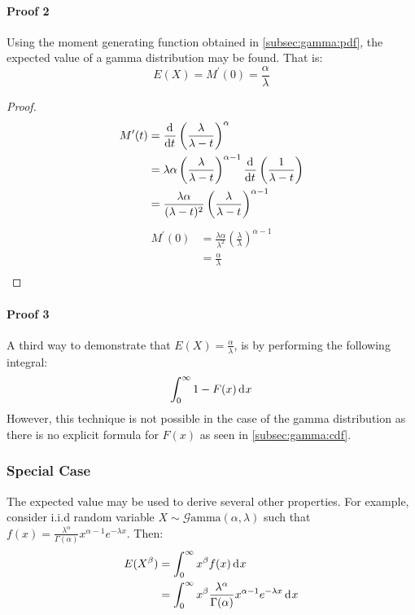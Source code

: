 \documentclass[12pt]{article}
\newcommand{\G}{\mathcal{G}}
\begin{document}
\paragraph{Proof 2}
Using the moment generating function obtained in \autoref{subsec:gamma:pdf}, the expected value of a gamma distribution
may be found. That is:
\begin{equation}
	E(X) = M^\prime(0) = \frac{\alpha}{\lambda}
\end{equation}
\begin{proof}
	\begin{equation}\label{eq:gamma:mgfprime}
		\begin{split}
			M^\prime(t)	&=	\mathop{}\!\frac{\mathrm{d}^{}}{\mathrm{d}t^{}}\left(\frac{\lambda}{\lambda - t}\right)^\alpha\\
						&=	\lambda\alpha\left(\frac{\lambda}{\lambda - t}\right)^{\alpha-1}\mathop{}\!\frac{\mathrm{d}^{}}{\mathrm{d}t^{}}\left(\frac{1}{\lambda - t}\right)\\
						&=	\frac{\lambda\alpha}{(\lambda - t)^2}\left(\frac{\lambda}{\lambda - t}\right)^{\alpha-1}
		\end{split}
	\end{equation}
	\begin{equation}
		\begin{split}
			M^\prime(0)	&=	\frac{\lambda\alpha}{\lambda^2}\left(\frac{\lambda}{\lambda}\right)^{\alpha-1}\\
						&=	\frac{\alpha}{\lambda}\\
		\end{split}
	\end{equation}
\end{proof}

\paragraph{Proof 3}
A third way to demonstrate that $E(X) = \frac{\alpha}{\lambda}$, is by performing the following integral:
\begin{equation}
	\int^\infty_0 1-F(x)\mathop{}\!\mathrm{d^{}}x
\end{equation}
However, this technique is not possible in the case of the gamma distribution as there is no explicit formula for $F(x)$
as seen in \autoref{subsec:gamma:cdf}.

\subsubsection{Special Case}
The expected value may be used to derive several other properties. For example, consider i.i.d random variable
$X\sim\G\text{amma}(\alpha, \lambda)$ such that $f(x) = \frac{\lambda^\alpha}{\Gamma(\alpha)}x^{\alpha-1}e^{-\lambda x}$.
Then:
\begin{equation}
	\begin{split}
		E(X^\beta)	&=	\int^\infty_0 x^\beta f(x)\mathop{}\!\mathrm{d^{}}x\\
					&=	\int^\infty_0 x^\beta \frac{\lambda^\alpha}{\Gamma(\alpha)}x^{\alpha-1}e^{-\lambda x}\mathop{}\!\mathrm{d^{}}x\\
	\end{split}
\end{equation}
\end{document}
